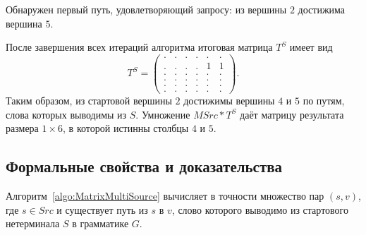 Обнаружен первый путь, удовлетворяющий запросу: из вершины $2$ достижима вершина $5$.

После завершения всех итераций алгоритма итоговая матрица $T^S$ имеет вид
{
    \renewcommand{\arraystretch}{0.7}
    \setlength\arraycolsep{2pt}
\[
    T^S =
    \begin{pmatrix}
    . & . & . & . & . & . \\
    . & . & . & . & 1 & 1 \\
    . & . & . & . & . & . \\
    . & . & . & . & . & . \\
    . & . & . & . & . & . \\
    . & . & . & . & . & .
    \end{pmatrix}.
\]
}
Таким образом, из стартовой вершины $2$ достижимы вершины $4$ и $5$ по путям, слова которых выводимы из $S$.
Умножение $MSrc * T^S$ даёт матрицу результата размера $1 \times 6$, в которой истинны столбцы $4$ и $5$.

\subsection{Формальные свойства и доказательства}
\label{subsec:CFPQ_MatrixMultiSource_properties}

\begin{theorem}[Корректность]
    Алгоритм~\ref{algo:MatrixMultiSource} вычисляет в точности множество пар $(s, v)$, где $s \in \mathit{Src}$ и существует путь из $s$ в $v$, слово которого выводимо из стартового нетерминала $S$ в грамматике $G$.
\end{theorem}

